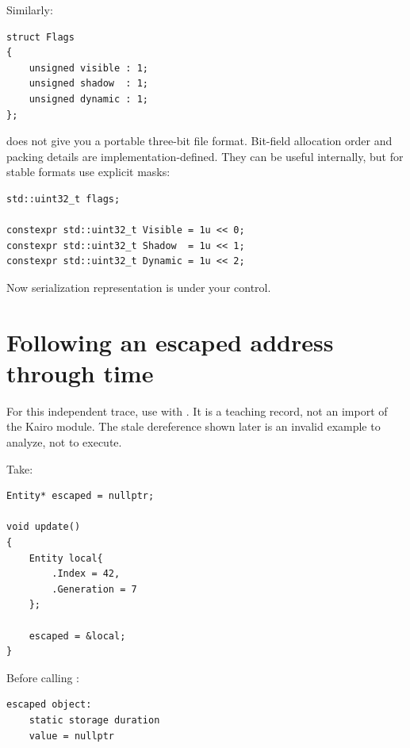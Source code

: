 \hypertarget{01-foundations-i-ch003-bit-fields}{}

Similarly:

\begin{verbatim}
struct Flags
{
    unsigned visible : 1;
    unsigned shadow  : 1;
    unsigned dynamic : 1;
};
\end{verbatim}

does not give you a portable three-bit file format. Bit-field allocation order and packing details are implementation-defined. They can be useful internally, but for stable formats use explicit masks:

\begin{verbatim}
std::uint32_t flags;

constexpr std::uint32_t Visible = 1u << 0;
constexpr std::uint32_t Shadow  = 1u << 1;
constexpr std::uint32_t Dynamic = 1u << 2;
\end{verbatim}

Now serialization representation is under your control.

\section{Following an escaped address through time}\label{01-foundations-i-ch003-following-an-escaped-address-through-time}

\hypertarget{01-foundations-i-ch003-following-an-escaped-address-through-time}{}

For this independent trace, use  with . It is a teaching record, not an import of the Kairo module. The stale dereference shown later is an invalid example to analyze, not to execute.

Take:

\begin{verbatim}
Entity* escaped = nullptr;

void update()
{
    Entity local{
        .Index = 42,
        .Generation = 7
    };

    escaped = &local;
}
\end{verbatim}

Before calling :

\begin{verbatim}
escaped object:
    static storage duration
    value = nullptr
\end{verbatim}

